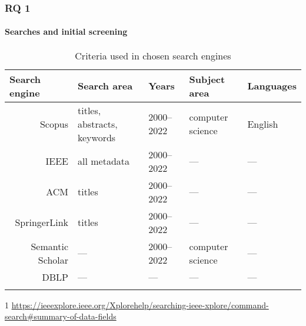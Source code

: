 \subsubsection{RQ 1}

\paragraph{Searches and initial screening}

\begin{table}[]
    \begin{threeparttable}[b]
        \centering
        \caption{Criteria used in chosen search engines}
        \begin{tabular}{rllll}
            \toprule
            \multicolumn{1}{l}{\textbf{Search engine}} & \textbf{Search area}        & \textbf{Years} & \textbf{Subject area} & \textbf{Languages} \\
            \midrule
            Scopus                                     & titles, abstracts, keywords & 2000--2022     & computer science      & English            \\
            IEEE                                       & all metadata\tnote{1}       & 2000--2022     & ---                   & ---                \\
            ACM                                        & titles                      & 2000--2022     & ---                   & ---                \\
            SpringerLink                               & titles                      & 2000--2022     & ---                   & ---                \\
            Semantic Scholar                           & ---                         & 2000--2022     & computer science      & ---                \\
            DBLP                                       & ---                         & ---            & ---                   & ---                \\
            \bottomrule
            \label{tab:search-criteria-used}
        \end{tabular}
        \begin{tablenotes}
            \item [1] \url{https://ieeexplore.ieee.org/Xplorehelp/searching-ieee-xplore/command-search#summary-of-data-fields}
        \end{tablenotes}
    \end{threeparttable}
\end{table}

